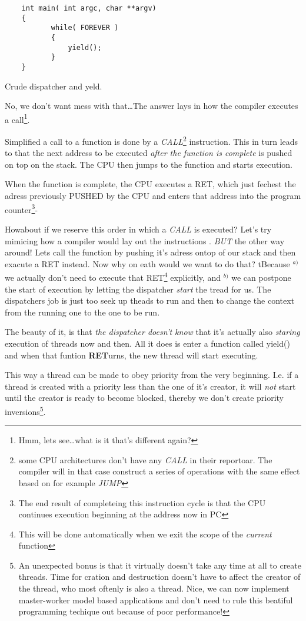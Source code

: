 {\begin{table}[!hbp]
\begin{verbatim}
	int main( int argc, char **argv)
	{
	       while( FOREVER )
	       {
	           yield();
	       }
	}
	\end{verbatim}
	\caption{Crude dispatcher and yeld.\label{hp2}}
	\end{table}

		No, we don't want mess with that\ldots The answer lays in how the compiler executes a call\footnote{Hmm, lets see\ldots what is it that's different again?}. 

		Simplified a call to a function is done by a \textit{CALL}\footnote{some CPU architectures don't have any \textit{CALL} in their reportoar. The compiler will in that case construct a series of operations with the same effect based on for example \textit{JUMP}} instruction. This in turn leads to that the next address to be executed \textit{after the function is complete} is pushed on top on the stack. The CPU then jumps to the function and starts execution. 

		When the function is complete, the CPU executes a RET, which just fechest the adress previously PUSHED by the CPU and enters that address into the program counter\footnote{The end result of completeing this instruction cycle is that the CPU continues execution beginning at the address now in PC}-

		Howabout if we reserve this order in which a \textit{CALL} is executed? Let's try mimicing how a compiler would lay out the instructions . \textit{BUT} the other way around! Lets call the function by pushing it's adress ontop of our stack and then exacute a RET instead. Now why on eath would we want to do that? 
		tBecause $^{a)}$ we actually don't need to execute that RET\footnote{This will be done automatically when we exit the scope of the \textit{current} function} explicitly, and $^{b)}$ we can postpone the start of execution by letting the dispatcher \textit{start} the tread for us. The dispatchers job is just too seek up theads to run and then to change the context from the running one to the one to be run. 

		The beauty of it, is that \textit{the dispatcher doesn't know} that it's actually also \textit{staring} execution of threads now and then. All it does is enter a function called yield() and when that funtion \textbf{\textit{}RET}urns, the new thread will start executing. 

		This way a thread can be made to obey priority from the very beginning. I.e. if a thread is created with a priority less than the one of it's creator, it will \textit{not} start until the creator is ready to become blocked, thereby we don't create priority inversions\footnote{An unexpected bonus is that it virtually doesn't take any time at all to create threads. Time for cration and destruction doesn't have to affect the creator of the thread, who most oftenly is also a thread. Nice, we can now implement master-worker model based applications and don't need to rule this beatiful programming techique out because of poor performance!}. 

}
